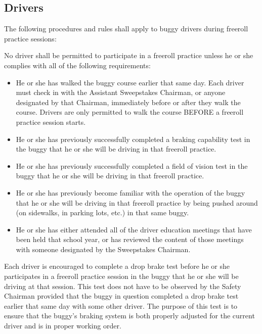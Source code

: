 \subsection{Drivers}

	The following procedures and rules shall apply to buggy drivers during freeroll
	practice sessions:
	\newline

	\noindent No driver shall be permitted to participate in a freeroll practice unless he or
	she complies with all of the following requirements:

	\begin{itemize}

		\item
		He or she has walked the buggy course earlier that same day. Each driver must
		check in with the Assistant Sweepstakes Chairman, or anyone designated by that
		Chairman, immediately before or after they walk the course. Drivers are only
		permitted to walk the course BEFORE a freeroll practice session starts.

		\item
		He or she has previously successfully completed a braking capability test in
		the buggy that he or she will be driving in that freeroll practice.

		\item
		He or she has previously successfully completed a field of vision test in the
		buggy that he or she will be driving in that freeroll practice.

		\item
		He or she has previously become familiar with the operation of the buggy that
		he or she will be driving in that freeroll practice by being pushed around (on
		sidewalks, in parking lots, etc.) in that same buggy.

		\item
		He or she has either attended all of the driver education meetings that have
		been held that school year, or has reviewed the content of those meetings with
		someone designated by the Sweepstakes Chairman.

	\end{itemize}
	
	Each driver is encouraged to complete a drop brake test before he or she
	participates in a freeroll practice session in the buggy that he or she will be
	driving at that session. This test does not have to be observed by the Safety
	Chairman provided that the buggy in question completed a drop brake test
	earlier that same day with some other driver. The purpose of this test is to
	ensure that the buggy's braking system is both properly adjusted for the
	current driver and is in proper working order.
	
